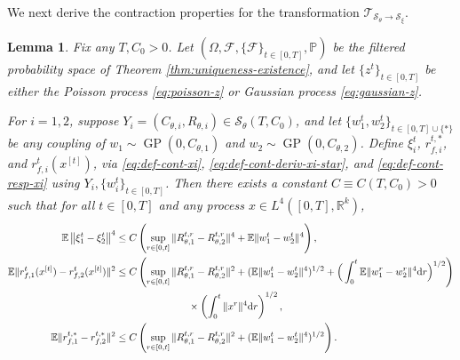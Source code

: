 \documentclass[11pt,letterpaper,reqno]{amsart}
\newtheorem{lem}[thm]{Lemma}
\theoremstyle{definition}
\def\d{\mathrm{d}}
\def\P{\mathbb{P}}
\def\E{\mathbb{E}}
\def\R{\mathbb{R}}
\def\GP{\operatorname{GP}}
\def\cF{\mathcal{F}}
\def\trsfrmB{\mathcal{T}_{{\mathcal{S}}_\theta \to \mathcal{S}_\xi}}
\newcommand{\norm}[1]{\|#1\|}
\begin{document}
We next derive the contraction properties for the transformation $\trsfrmB$.

\begin{lem} \label{lem:contract-xi}
Fix any $T,C_0>0$.
Let $(\Omega,\cF,\{\cF\}_{t \in [0,T]},\P)$ be the filtered probability
space of Theorem \ref{thm:uniqueness-existence}, and
let $\{z^t\}_{t \in [0,T]}$ be either the Poisson process \eqref{eq:poisson-z}
or Gaussian process \eqref{eq:gaussian-z}.

For $i=1,2$, suppose $Y_i=(C_{\theta,i},R_{\theta,i}) \in
{\mathcal{S}}_\theta(T,C_0)$, and let $\{w_1^t,w_2^t\}_{t \in [0,T] \cup \{*\}}$
be any coupling of $w_1 \sim \GP(0,C_{\theta,1})$
and $w_2 \sim \GP(0,C_{\theta,2})$. Define $\xi_i^t$, 
$r_{f,i}^{t,*}$, and $r_{f,i}^t(x^{[t]})$,
via \eqref{eq:def-cont-xi}, \eqref{eq:def-cont-deriv-xi-star}, and
\eqref{eq:def-cont-resp-xi} using
$Y_i,\{w_i^t\}_{t \in [0,T]}$.
Then there exists a constant $C \equiv C(T,C_0)>0$ such that for all $t \in
[0,T]$ and any process $x \in L^4([0,T],\R^k)$,
\begin{align}
\E\left\|\xi^t_1 - \xi^t_2\right\|^4 &\leq C
\left(\sup_{r \in [0,t]} \|R_{\theta,1}^{t,r}-R_{\theta,2}^{t,r}\|^4
+\E\|w_1^t-w_2^t\|^4\right),\label{eq:contract-xi}\\
\E\|r_{f,1}^{t}(x^{[t]})-r_{f,2}^{t}(x^{[t]})\|^2 &\leq C
\left(\sup_{r \in [0,t]} \|R_{\theta,1}^{t,r}-R_{\theta,2}^{t,r}\|^2
+(\E\|w_1^t-w_2^t\|^4)^{1/2}
+\Big(\int_0^t \E\|w_1^r-w_2^r\|^4 \d r\Big)^{1/2}\right)\notag\\
&\hspace{1in}\times \left(\int_0^t \|x^r\|^4 \d r\right)^{1/2},\label{eq:contract-rfxi}\\
\E\norm{r_{f,1}^{t,*}-r_{f,2}^{t,*}}^2
&\leq C\left(\sup_{r \in [0,t]} \|R_{\theta,1}^{t,r}-R_{\theta,2}^{t,r}\|^2
+(\E\|w_1^t-w_2^t\|^4)^{1/2}\right).\label{eq:contract-rfxi-star}
\end{align}
\end{lem}
\end{document}
